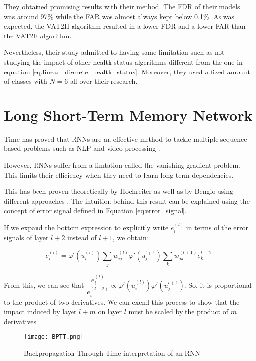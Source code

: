 They obtained promising results with their method.
The FDR of their models was around 97\% while the FAR was almost always kept below 0.1\%.
As was expected, the VAT2H algorithm resulted in a lower FDR and a lower FAR than the VAT2F algorithm.

Nevertheless, their study admitted to having some limitation such as not studying the impact of other health status algorithms different from the one in equation \ref{eq:linear_discrete_health_status}.
Moreover, they used a fixed amount of classes with $N=6$ all over their research.

\section{Long Short-Term Memory Network}\label{sec:lstm}

Time has proved that RNNs are an effective method to tackle multiple sequence-based problems such as NLP \cite{tarwani2017survey} and video processing \cite{yadav2022survey}.

However, RNNs suffer from a limtation called the vanishing gradient problem.
This limits their efficiency when they need to learn long term dependencies.

This has been proven theoretically by Hochreiter \cite{hochreiter1998vanishing} as well as by Bengio using different approaches \cite{bengio1993problem}.
The intuition behind this result can be explained using the concept of error signal defined in Equation \ref{eq:error_signal}.

If we expand the bottom expression to explicitly write $e_i^{(l)}$ in terms of the error signals of layer $l+2$ instead of $l+1$, we obtain:

$$
    e_i^{(l)} = \varphi '(u_i^{(l)}) \sum_j w_{ij}^{(l)} \varphi '(u_j^{l+1}) \sum_k w_{jk}^{(l+1)} e_k^{l+2}
$$

From this, we can see that $\dfrac{e_i^{(l)}}{e_i^{(l+2)}} \propto \varphi '(u_i^{(l)})\varphi '(u_j^{l+1})$.
So, it is proportional to the product of two derivatives.
We can exend this process to show that the impact induced by layer $l + m$ on layer $l$ must be scaled by the product of $m$ derivatives.

\begin{figure}
    \begin{center}
        \texttt{[image: BPTT.png]}
        \caption[Backpropagation Through Time]{Backpropagation Through Time interpretation of an RNN - \cite{Xu16}}
        \label{fig:BPTT}
    \end{center}
\end{figure}

